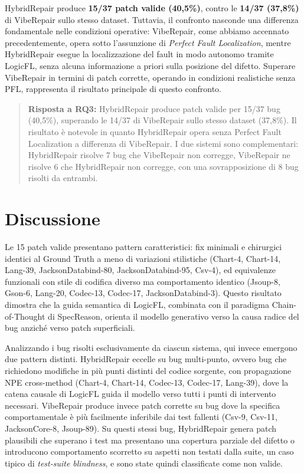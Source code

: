 HybridRepair produce \textbf{15/37 patch valide (40,5\%)}, contro le \textbf{14/37 (37,8\%)}
di VibeRepair sullo stesso dataset. Tuttavia, il confronto nasconde una differenza
fondamentale nelle condizioni operative: VibeRepair, come abbiamo accennato precedentemente,
opera sotto l'assunzione di \emph{Perfect Fault Localization}, mentre HybridRepair esegue la localizzazione del fault in
modo autonomo tramite LogicFL, senza alcuna informazione a priori sulla posizione del
difetto. Superare VibeRepair in termini di patch corrette, operando in condizioni
realistiche senza PFL, rappresenta il risultato principale di questo confronto.

\begin{quote}
\textbf{Risposta a RQ3:} HybridRepair produce patch valide per 15/37 bug (40,5\%),
superando le 14/37 di VibeRepair sullo stesso dataset (37,8\%).
Il risultato è notevole in quanto HybridRepair opera senza Perfect Fault Localization
a differenza di VibeRepair.
I due sistemi sono complementari: HybridRepair risolve 7 bug che VibeRepair non corregge,
VibeRepair ne risolve 6 che HybridRepair non corregge, con una sovrapposizione di 8 bug
risolti da entrambi.
\end{quote}


\section{Discussione}

Le 15 patch valide presentano pattern caratteristici: fix minimali e chirurgici identici
al Ground Truth a meno di variazioni stilistiche
(Chart-4, Chart-14, Lang-39, JacksonDatabind-80, JacksonDatabind-95, Csv-4),
ed equivalenze funzionali con stile di codifica diverso ma comportamento identico
(Jsoup-8, Gson-6, Lang-20, Codec-13, Codec-17, JacksonDatabind-3).
Questo risultato dimostra che la guida semantica di LogicFL, combinata con il paradigma
Chain-of-Thought di SpecReason, orienta il modello generativo verso la causa radice del
bug anziché verso patch superficiali.

Analizzando i bug risolti esclusivamente da ciascun sistema, qui invece emergono due pattern
distinti. HybridRepair eccelle su bug multi-punto, ovvero bug che richiedono modifiche in più
punti distinti del codice sorgente, con propagazione NPE cross-method
(Chart-4, Chart-14, Codec-13, Codec-17, Lang-39), dove la catena causale di LogicFL
guida il modello verso tutti i punti di intervento necessari.
VibeRepair produce invece patch corrette su bug dove la specifica comportamentale è più
facilmente inferibile dai test fallenti (Csv-9, Csv-11, JacksonCore-8, Jsoup-89).
Su questi stessi bug, HybridRepair genera patch plausibili che superano i test ma presentano
una copertura parziale del difetto o introducono comportamento scorretto su aspetti non testati
dalla suite, un caso tipico di \emph{test-suite blindness}, e sono state quindi classificate come 
non valide.


